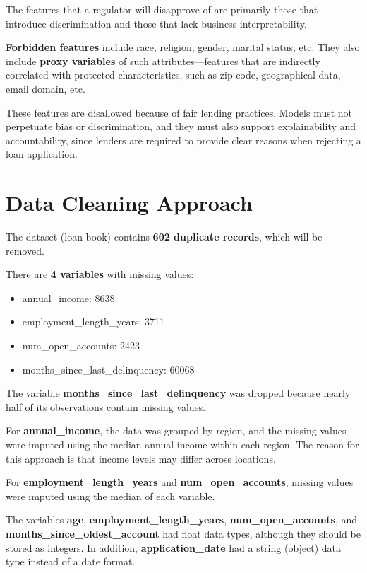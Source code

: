 \documentclass[
  letterpaper,
  DIV=11,
  numbers=noendperiod]{scrartcl}
\begin{document}
The features that a regulator will disapprove of are primarily those
that introduce discrimination and those that lack business
interpretability.

\textbf{Forbidden features} include race, religion, gender, marital
status, etc. They also include \textbf{proxy variables} of such
attributes---features that are indirectly correlated with protected
characteristics, such as zip code, geographical data, email domain, etc.

These features are disallowed because of fair lending practices. Models
must not perpetuate bias or discrimination, and they must also support
explainability and accountability, since lenders are required to provide
clear reasons when rejecting a loan application.

\section{Data Cleaning Approach}

The dataset (loan book) contains \textbf{602 duplicate records}, which
will be removed.

There are \textbf{4 variables} with missing values:

\begin{itemize}
    \item annual\_income: 8638
    \item employment\_length\_years: 3711
    \item num\_open\_accounts: 2423
    \item months\_since\_last\_delinquency: 60068
\end{itemize}

The variable \textbf{months\_since\_last\_delinquency} was dropped
because nearly half of its observations contain missing values.

For \textbf{annual\_income}, the data was grouped by region, and the
missing values were imputed using the median annual income within each
region. The reason for this approach is that income levels may differ
across locations.

For \textbf{employment\_length\_years} and \textbf{num\_open\_accounts},
missing values were imputed using the median of each variable.

The variables \textbf{age}, \textbf{employment\_length\_years},
\textbf{num\_open\_accounts}, and
\textbf{months\_since\_oldest\_account} had float data types, although
they should be stored as integers. In addition,
\textbf{application\_date} had a string (object) data type instead of a
date format.
\end{document}
